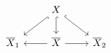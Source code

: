 \documentclass[crop,dvisvgm]{standalone}
\begin{document}
\[\begin {tikzcd}
          & X \ar [dl,hook] \ar [d,hook] \ar [dr,hook]
        \\\overline {X}_1
          & \overline {X} \ar [l] \ar [r]
          & \overline {X}_2
        \end {tikzcd}\]
\end{document}
